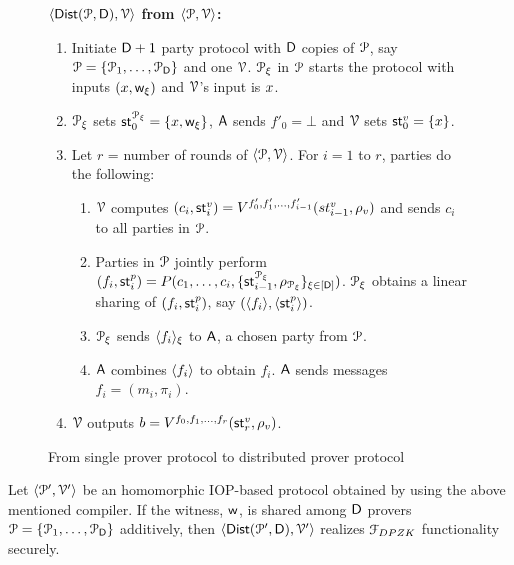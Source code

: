 \begin{figure}[h!]
	{\footnotesize
		\begin{framed}
				\noindent \textbf{$\langle \mathsf{Dist}(\mathcal{P}, \mathsf{D}),\mathcal{V}\rangle$ from $\langle \mathcal{P},\mathcal{V}\rangle$:}
				\begin{enumerate}[{\rm 1.}]
					\item Initiate $\mathsf{D} + 1$ party protocol with $\mathsf{D}$ copies of $\mathcal{P}$, say $\mathcal{P} = \{\mathcal{P}_1, \ldots, \mathcal{P}_{\mathsf{D}}\}$ and one $\mathcal{V}$. $\mathcal{P}_\xi$ in $\mathcal{P}$ starts the protocol with inputs $({x}, \mathsf{w}_\xi)$ and $\mathcal{V}$'s input is ${x}$.
					\item $\mathcal{P}_\xi$ sets $\mathsf{st}^{\mathcal{P}_\xi}_0 = \{{x}, \mathsf{w}_{\xi}\}$, $\mathsf{A}$ sends $f'_0 = \bot$ and $\mathcal{V}$ sets $\mathsf{st}^v_0 = \{{x}\}$.
					\item Let $r$ = number of rounds of $\langle \mathcal{P},\mathcal{V}\rangle$. 
					For $i = 1$ to $r$, parties do the following:
					\begin{enumerate}
						\item $\mathcal{V}$ computes $(c_i,\mathsf{st}^v_i) = V^{f'_0, f'_1, \ldots, f'_{i-1}}(st^v_{i-1}, \rho_v)$ and sends $c_i$ to all parties in $\mathcal{P}$.
						\item Parties in $\mathcal{P}$ jointly perform 
						\\$(f_i, \mathsf{st}^p_i) = P(c_1,\ldots, c_i, \{\mathsf{st}^{\mathcal{P}_\xi}_{i-1} , \rho_{\mathcal{P}_\xi}\}_{\xi \in [\mathsf{D}]})$. $\mathcal{P}_\xi$ obtains a linear sharing of $(f_i, \mathsf{st}^p_i)$, say $(\langle f_i \rangle, \langle \mathsf{st}^p_i \rangle)$.
						\item $\mathcal{P}_\xi$ sends $\langle f_i \rangle_{\xi}$ to $\mathsf{A}$, a chosen party from $\mathcal{P}$.
						\item $\mathsf{A}$ combines $\langle f_i \rangle$ to obtain $f_i$. $\mathsf{A}$ sends messages $f_i=(m_i, \pi_i)$.
					\end{enumerate}
					\item $\mathcal{V}$ outputs $b = V^{f_0, f_1, \ldots, f_r} ( \mathsf{st}^v_r , \rho_v)$.
				\end{enumerate}
		\end{framed}
		\caption{From single prover protocol to distributed prover protocol}
		\label{fig:DistPV}
	}
\end{figure}

\begin{lemma}\label{lemma:generic_dpzk}
	Let $\langle \mathcal{P}',\mathcal{V}'\rangle$ be an homomorphic IOP-based protocol obtained by using the above mentioned compiler. If the witness, $\mathsf{w}$, is shared among $\mathsf{D}$ provers $\mathcal{P} = \{\mathcal{P}_1, \ldots, \mathcal{P}_{\mathsf{D}}\}$ additively, then $\langle \mathsf{Dist}(\mathcal{P}', \mathsf{D}),\mathcal{V}'\rangle$  realizes $\mathcal{F}_{DPZK}$ functionality securely.
\end{lemma}
	
